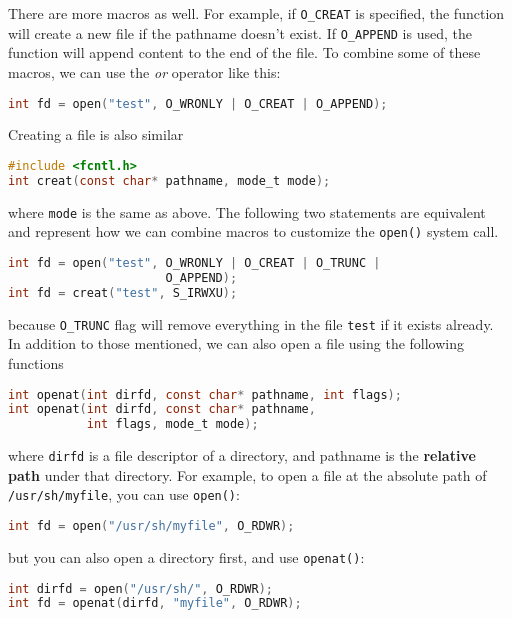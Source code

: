 \documentclass{article}
\newcommand{\bold}[1]{\textbf{#1}}
\newcommand{\code}[1]{\texttt{#1}}
\begin{document}
There are more macros as well. For example, if \code{O\_CREAT} is specified, the function will create a new file if the pathname doesn't exist. If \code{O\_APPEND} is used, the function will append content to the end of the file. To combine some of these macros, we can use the \emph{or} operator like this:

\begin{lstlisting}[language=C]
int fd = open("test", O_WRONLY | O_CREAT | O_APPEND);
\end{lstlisting}

Creating a file is also similar 

\begin{lstlisting}[language=C]
#include <fcntl.h>
int creat(const char* pathname, mode_t mode);
\end{lstlisting}

where \code{mode} is the same as above. The following two statements are equivalent and represent how we can combine macros to customize the \code{open()} system call. 

\begin{lstlisting}[language=C]
int fd = open("test", O_WRONLY | O_CREAT | O_TRUNC |
                      O_APPEND);
int fd = creat("test", S_IRWXU);
\end{lstlisting}

because \code{O\_TRUNC} flag will remove everything in the file \code{test} if it exists already. \\ 

In addition to those mentioned, we can also open a file using the following functions 

\begin{lstlisting}[language=C]
int openat(int dirfd, const char* pathname, int flags);
int openat(int dirfd, const char* pathname, 
           int flags, mode_t mode);
\end{lstlisting}

where \code{dirfd} is a file descriptor of a directory, and pathname is the \bold{relative path} under that directory. For example, to open a file at the absolute path of \code{/usr/sh/myfile}, you can use \code{open()}:

\begin{lstlisting}[language=C]
int fd = open("/usr/sh/myfile", O_RDWR);
\end{lstlisting}

but you can also open a directory first, and use \code{openat()}:

\begin{lstlisting}[language=C]
int dirfd = open("/usr/sh/", O_RDWR);
int fd = openat(dirfd, "myfile", O_RDWR);
\end{lstlisting}
\end{document}

